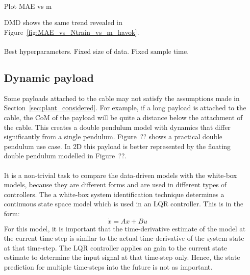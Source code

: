         \paragraph{}
        Plot MAE vs m
        
        DMD shows the same trend revealed in Figure~\ref{fig:MAE_vs_Ntrain_vs_m_havok}.

        \paragraph{}

        Best hyperparameters.
        Fixed size of data.
        Fixed sample time.

    \subsection{Dynamic payload} \label{sec:dynamic_payload}
        Some payloads attached to the cable may not satisfy the assumptions made in Section~\ref{sec:plant_considered}.
        For example, if a long payload is attached to the cable, the CoM of the payload will be quite a distance below the attachment of the cable.
        This creates a double pendulum model with dynamics that differ significantly from a single pendulum.
        Figure~?? shows a practical double pendulum use case. 
        In 2D this payload is better represented by the floating double pendulum modelled in Figure~??.

        
        \paragraph{}
        It is a non-trivial task to compare the data-driven models with the white-box models,
        because they are different forms and are used in different types of controllers.
        The a white-box system identification technique determines a continuous state space model 
        which is used in an LQR controller. 
        This is in the form:
        \begin{equation}
            \dot{x} = A x + B u
        \end{equation}
        For this model, it is important that the time-derivative estimate of the model 
        at the current time-step 
        is similar to the actual time-derivative of the system state at that time-step.
        The LQR controller applies an gain to the current state estimate 
        to determine the input signal at that time-step only.
        Hence, the state prediction for multiple time-steps into the future is not as important.

